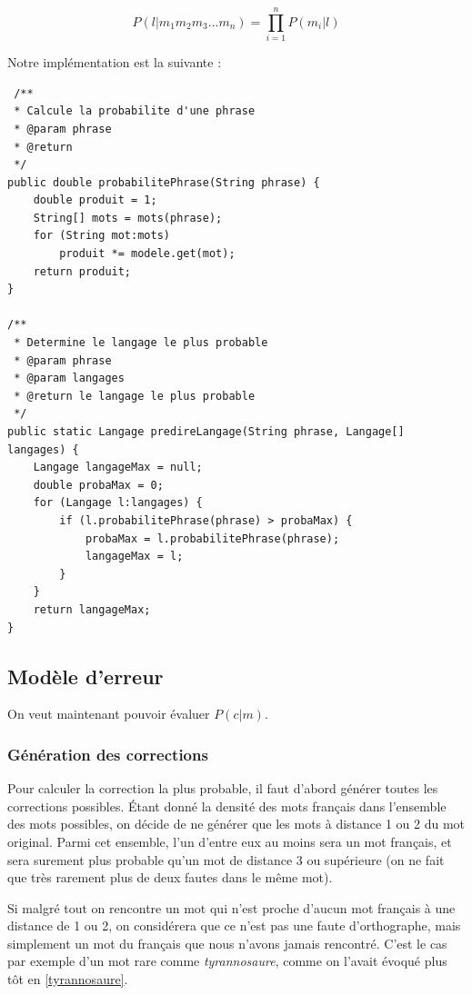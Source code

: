 \documentclass[10pt,a4paper]{article}
\begin{document}
 \begin{equation}
P(l|m_1m_2m_3...m_n) = \prod_{i=1}^nP(m_i|l)
 \end{equation}
 
 Notre implémentation est la suivante : 
 
 \begin{lstlisting}
 /**
 * Calcule la probabilite d'une phrase
 * @param phrase
 * @return 
 */
public double probabilitePhrase(String phrase) {
    double produit = 1;
    String[] mots = mots(phrase);
    for (String mot:mots)
        produit *= modele.get(mot);
    return produit;
}

/**
 * Determine le langage le plus probable
 * @param phrase
 * @param langages
 * @return le langage le plus probable
 */
public static Langage predireLangage(String phrase, Langage[] langages) {
    Langage langageMax = null;
    double probaMax = 0;
    for (Langage l:langages) {
        if (l.probabilitePhrase(phrase) > probaMax) {
            probaMax = l.probabilitePhrase(phrase);
            langageMax = l;
        }
    }
    return langageMax;
}
 \end{lstlisting}

\subsection{Modèle d'erreur}

On veut maintenant pouvoir évaluer $P(c|m)$.

\subsubsection{Génération des corrections}

Pour calculer la correction la plus probable, il faut d'abord générer toutes les corrections possibles.
Étant donné la densité des mots français dans l'ensemble des mots possibles, on décide de ne générer que les mots à distance 1 ou 2 du mot original.
Parmi cet ensemble, l'un d'entre eux au moins sera un mot français, et sera surement plus probable qu'un mot de distance 3 ou supérieure (on ne fait que très rarement plus de deux fautes dans le même mot).

Si malgré tout on rencontre un mot qui n'est proche d'aucun mot français à une distance de 1 ou 2, on considérera que ce n'est pas une faute d'orthographe, mais simplement un mot du français que nous n'avons jamais rencontré. C'est le cas par exemple d'un mot rare comme \textit{tyrannosaure}, comme on l'avait évoqué plus tôt en \ref{tyrannosaure}.
\end{document}
